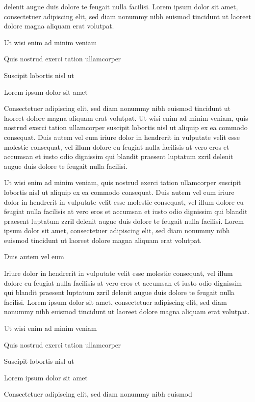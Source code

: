 \documentclass[11pt]{article}\makeatletter
\begin{document}
      delenit augue duis dolore te feugait nulla facilisi. Lorem ipsum dolor
      sit amet, consectetuer adipiscing elit, sed diam nonummy nibh euismod
      tincidunt ut laoreet dolore magna aliquam erat volutpat. \par Ut wisi enim ad minim veniam\par Quis nostrud exerci tation ullamcorper \par Suscipit lobortis nisl ut \par Lorem ipsum dolor sit amet\par Consectetuer adipiscing elit, sed diam nonummy nibh euismod
      tincidunt ut laoreet dolore magna aliquam erat volutpat. Ut wisi enim
      ad minim veniam, quis nostrud exerci tation ullamcorper suscipit
      lobortis nisl ut aliquip ex ea commodo consequat. Duis autem vel eum
      iriure dolor in hendrerit in vulputate velit esse molestie consequat,
      vel illum dolore eu feugiat nulla facilisis at vero eros et accumsan
      et iusto odio dignissim qui blandit praesent luptatum zzril delenit
      augue duis dolore te feugait nulla facilisi.\par Ut wisi enim ad minim veniam, quis nostrud exerci tation
      ullamcorper suscipit lobortis nisl ut aliquip ex ea commodo
      consequat. Duis autem vel eum iriure dolor in hendrerit in vulputate
      velit esse molestie consequat, vel illum dolore eu feugiat nulla
      facilisis at vero eros et accumsan et iusto odio dignissim qui blandit
      praesent luptatum zzril delenit augue duis dolore te feugait nulla
      facilisi. Lorem ipsum dolor sit amet, consectetuer adipiscing elit,
      sed diam nonummy nibh euismod tincidunt ut laoreet dolore magna
      aliquam erat volutpat. \par Duis autem vel eum \par Iriure dolor in hendrerit in vulputate velit esse molestie
      consequat, vel illum dolore eu feugiat nulla facilisis at vero eros et
      accumsan et iusto odio dignissim qui blandit praesent luptatum zzril
      delenit augue duis dolore te feugait nulla facilisi. Lorem ipsum dolor
      sit amet, consectetuer adipiscing elit, sed diam nonummy nibh euismod
      tincidunt ut laoreet dolore magna aliquam erat volutpat. \par Ut wisi enim ad minim veniam\par Quis nostrud exerci tation ullamcorper \par Suscipit lobortis nisl ut \par Lorem ipsum dolor sit amet\par Consectetuer adipiscing elit, sed diam nonummy nibh euismod
\end{document}
